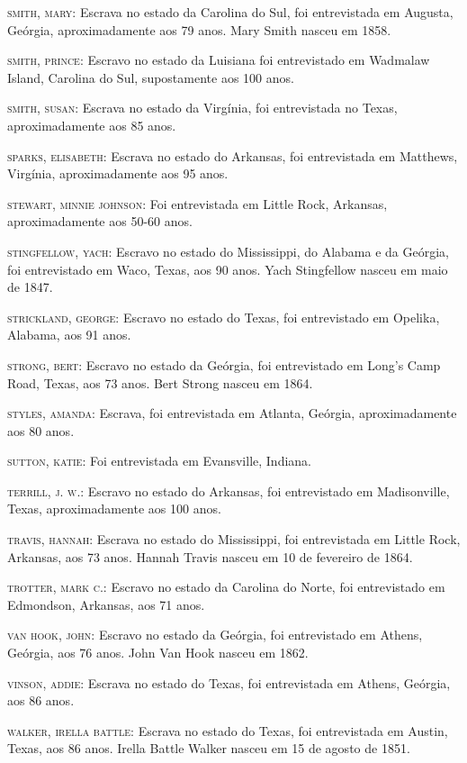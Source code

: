 \begin{Parskip}
\textsc{smith, mary:} Escrava no estado da Carolina do Sul, foi
entrevistada em Augusta, Geórgia, aproximadamente aos 79 anos. Mary
Smith nasceu em 1858.

\textsc{smith, prince:} Escravo no estado da Luisiana foi entrevistado
em Wadmalaw Island, Carolina do Sul, supostamente aos 100 anos.

\textsc{smith, susan:} Escrava no estado da Virgínia, foi entrevistada
no Texas, aproximadamente aos 85 anos.

\textsc{sparks, elisabeth:} Escrava no estado do Arkansas, foi
entrevistada em Matthews, Virgínia, aproximadamente aos 95 anos.

\textsc{stewart, minnie johnson:} Foi entrevistada em Little Rock,
Arkansas, aproximadamente aos 50-60 anos.

\textsc{stingfellow, yach:} Escravo no estado do Mississippi, do Alabama
e da Geórgia, foi entrevistado em Waco, Texas, aos 90 anos. Yach
Stingfellow nasceu em maio de 1847.

\textsc{strickland, george:} Escravo no estado do Texas, foi
entrevistado em Opelika, Alabama, aos 91 anos.

\textsc{strong, bert:} Escravo no estado da Geórgia, foi entrevistado em
Long's Camp Road, Texas, aos 73 anos. Bert Strong nasceu em 1864.

\textsc{styles, amanda:} Escrava, foi entrevistada em Atlanta, Geórgia,
aproximadamente aos 80 anos.

\textsc{sutton, katie:} Foi entrevistada em Evansville, Indiana.

\textsc{terrill, j. w.:} Escravo no estado do Arkansas, foi entrevistado
em Madisonville, Texas, aproximadamente aos 100 anos.

\textsc{travis, hannah:} Escrava no estado do Mississippi, foi
entrevistada em Little Rock, Arkansas, aos 73 anos. Hannah Travis nasceu
em 10 de fevereiro de 1864.

\textsc{trotter, mark c.:} Escravo no estado da Carolina do Norte, foi
entrevistado em Edmondson, Arkansas, aos 71 anos.

\textsc{van hook, john:} Escravo no estado da Geórgia, foi entrevistado
em Athens, Geórgia, aos 76 anos. John Van Hook nasceu em 1862.

\textsc{vinson, addie:} Escrava no estado do Texas, foi entrevistada em
Athens, Geórgia, aos 86 anos.

\textsc{walker, irella battle:} Escrava no estado do Texas, foi
entrevistada em Austin, Texas, aos 86 anos. Irella Battle Walker nasceu
em 15 de agosto de 1851.


\end{Parskip}
